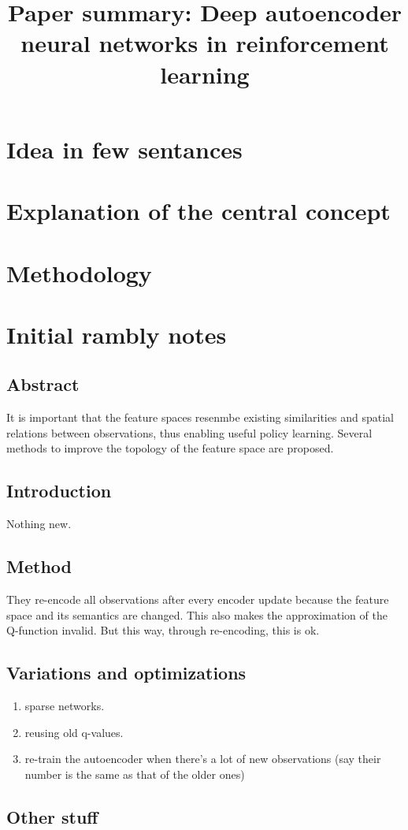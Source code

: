 \documentclass{article}
\title{Paper summary: Deep autoencoder neural networks in reinforcement learning}
\begin{document}
\maketitle


\section{Idea in few sentances}

\section{Explanation of the central concept}

\section{Methodology}


\section{Initial rambly notes}
\subsection{Abstract}
It is important that the feature spaces resenmbe existing similarities and spatial relations
between observations, thus enabling useful policy learning.
Several methods to improve the topology of the feature space are proposed.

\subsection{Introduction}
Nothing new.


\subsection{Method}
They re-encode all observations after every encoder update because
the feature space and its semantics are changed.
This also makes the approximation of the Q-function invalid.
But this way, through re-encoding, this is ok.

\subsection{Variations and optimizations}
\begin{enumerate}
		\item sparse networks.
		\item reusing old q-values.
		\item re-train the autoencoder when there's a lot of new observations
				(say their number is the same as that of the older ones)
\end{enumerate}

\subsection{Other stuff}
\end{document}

